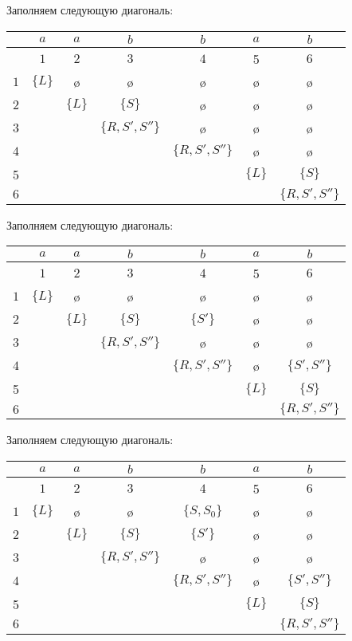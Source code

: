 \begin{example}
Заполняем следующую диагональ:

\begin{center}
  \begin{tabular}{c||cc|cc|cc}
    & $a$ & $a$ & $b$ & $b$ & $a$ & $b$ \\ \hline
    & $1$ & $2$ & $3$ & $4$ & 5 & $6$ \\ \hline \hline
  $1$ & $\{L\}$ & \o & \o & \o & \o & \o \\ 
  $2$ &   & $\{L\}$ & $\{S\}$ & \o & \o & \o \\ \hline
  $3$ &   &   & $\{R, S', S''\}$ & \o & \o & \o \\ 
  $4$ &   &   &   & $\{R, S', S''\}$ & \o & \o \\ \hline
  5 &   &   &   &   & $\{L\}$ & $\{S\}$ \\ 
  $6$ &   &   &   &   &   & $\{R, S', S''\}$
  \end{tabular}
\end{center}

Заполняем следующую диагональ:

\begin{center}
  \begin{tabular}{c||cc|cc|cc}
    & $a$ & $a$ & $b$ & $b$ & $a$ & $b$ \\ \hline
    & $1$ & $2$ & $3$ & $4$ & 5 & $6$ \\ \hline \hline
  $1$ & $\{L\}$ & \o & \o & \o & \o & \o \\ 
  $2$ &   & $\{L\}$ & $\{S\}$ & $\{S'\}$ & \o & \o \\ \hline
  $3$ &   &   & $\{R, S', S''\}$ & \o & \o & \o \\ 
  $4$ &   &   &   & $\{R, S', S''\}$ & \o & $\{S', S''\}$ \\ \hline
  5 &   &   &   &   & $\{L\}$ & $\{S\}$ \\ 
  $6$ &   &   &   &   &   & $\{R, S', S''\}$
  \end{tabular}
\end{center}

Заполняем следующую диагональ:

\begin{center}
  \begin{tabular}{c||cc|cc|cc}
    & $a$ & $a$ & $b$ & $b$ & $a$ & $b$ \\ \hline
    & $1$ & $2$ & $3$ & $4$ & 5 & $6$ \\ \hline \hline
  $1$ & $\{L\}$ & \o & \o & $\{S, S_0\}$ & \o & \o \\ 
  $2$ &   & $\{L\}$ & $\{S\}$ & $\{S'\}$ & \o & \o \\ \hline
  $3$ &   &   & $\{R, S', S''\}$ & \o & \o & \o \\ 
  $4$ &   &   &   & $\{R, S', S''\}$ & \o & $\{S', S''\}$ \\ \hline
  5 &   &   &   &   & $\{L\}$ & $\{S\}$ \\ 
  $6$ &   &   &   &   &   & $\{R, S', S''\}$
  \end{tabular}
\end{center}


\end{example}
